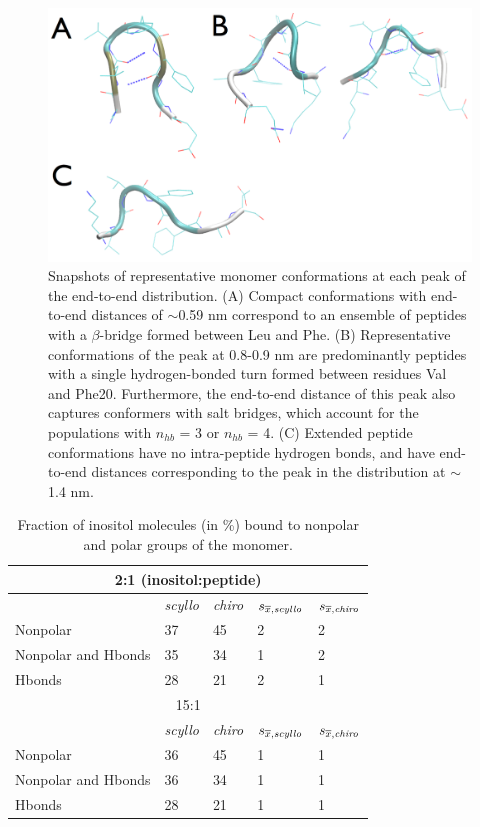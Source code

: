 \begin{figure}[ht]
\centering
\includegraphics[width=14cm]{figures/appendixA/inos2_figures_SI_monomerConformations.pdf}
\caption[Snapshots of representative monomer conformations at each peak of the end-to-end distribution.]{Snapshots of representative monomer conformations at each peak of the end-to-end distribution. 
(A)  Compact conformations with end-to-end distances of $\sim$0.59 nm correspond to an ensemble of peptides with a $\beta$-bridge formed between Leu and Phe. (B) Representative conformations of the peak at 0.8-0.9 nm are predominantly peptides with a single hydrogen-bonded turn formed between residues Val and Phe20. Furthermore, the end-to-end distance of this peak also captures conformers with salt bridges, which account for the populations with $n_{hb}$ = 3 or $n_{hb}$ = 4. (C)  Extended peptide conformations have no intra-peptide hydrogen bonds, and have end-to-end distances corresponding to the peak in the distribution at $\sim$1.4 nm.}
\label{fig:SI-monomersConformations}
\end{figure}

\begin{table}[ht]
\centering
\begin{tabular}{|l|llll|}
\hline
\multicolumn{5}{|c|}{2:1 (inositol:peptide)} \\ 
\hline
& \emph{scyllo} & \emph{chiro} & $s_{\overline{x}, \emph{scyllo}}$ & $s_{\overline{x}, \emph{chiro}}$ \\ 
\hline
Nonpolar & 37 & 45 & 2 & 2 \\ 
Nonpolar and Hbonds & 35 & 34 & 1 & 2 \\ 
Hbonds & 28 & 21 & 2 & 1 \\
\hline
\hline
\multicolumn{5}{|c|}{15:1} \\ 
\hline
 & \emph{scyllo} & \emph{chiro} & $s_{\overline{x}, \emph{scyllo}}$ & $s_{\overline{x}, \emph{chiro}}$ \\ 
\hline
Nonpolar & 36 & 45 & 1 & 1 \\
Nonpolar and Hbonds & 36 & 34 & 1 & 1 \\ 
Hbonds & 28 & 21 & 1 & 1 \\
\hline
\end{tabular}
\caption{Fraction of inositol molecules (in \%) bound to nonpolar and polar groups of the monomer.}    
\label{tbl:SI-monomersBindingMode}
\end{table}

